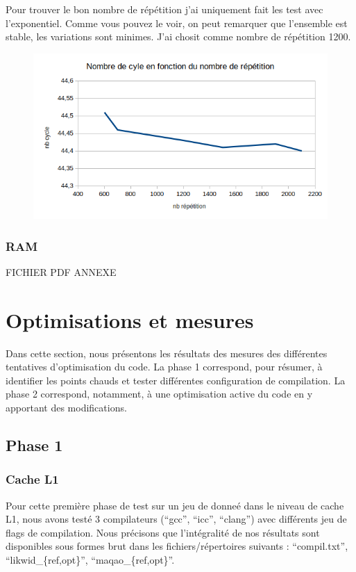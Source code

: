 \documentclass[12pt,a4paper]{article}
\begin{document}
Pour trouver le bon nombre de répétition j'ai uniquement fait les test avec
l'exponentiel. Comme vous pouvez le voir, on peut remarquer que l'ensemble est
stable, les variations sont minimes. J'ai chosit comme nombre de répétition
1200.
\begin{figure}[h]
    \includegraphics[scale=0.8]{figures/L2/L2repet.png}
    \caption{ }
\end{figure}

\subsubsection{RAM}

FICHIER PDF ANNEXE

\section{Optimisations et mesures}

Dans cette section, nous présentons les résultats des mesures des différentes
tentatives d'optimisation du code. La phase 1 correspond, pour résumer, à
identifier les points chauds et tester différentes configuration de compilation.
La phase 2 correspond, notamment, à une optimisation active du code en y apportant
des modifications.

\subsection{Phase 1}

\subsubsection{Cache L1}

Pour cette première phase de test sur un jeu de donneé dans le niveau de cache
L1, nous avons testé 3 compilateurs (\enquote{gcc}, \enquote{icc},
\enquote{clang}) avec différents jeu de flags de compilation. Nous précisons que
l'intégralité de nos résultats sont disponibles sous formes brut dans les
fichiers/répertoires suivants : \enquote{compil.txt},
\enquote{likwid\_\{ref,opt\}}, \enquote{maqao\_\{ref,opt\}}.
\end{document}
